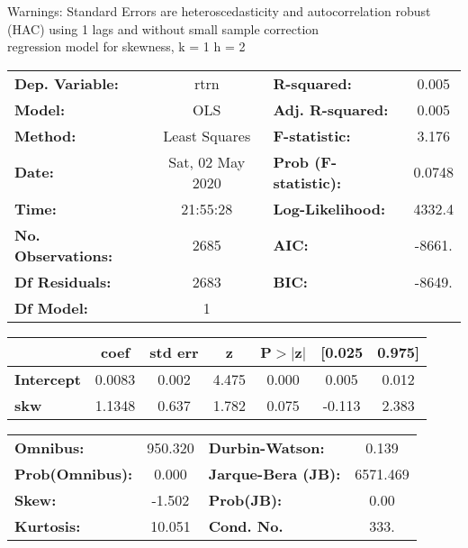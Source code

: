 Warnings: \newline
 [1] Standard Errors are heteroscedasticity and autocorrelation robust (HAC) using 1 lags and without small sample correction\\ 

regression model for skewness, k = 1 h = 2\begin{center}
\begin{tabular}{lclc}
\toprule
\textbf{Dep. Variable:}    &       rtrn       & \textbf{  R-squared:         } &     0.005   \\
\textbf{Model:}            &       OLS        & \textbf{  Adj. R-squared:    } &     0.005   \\
\textbf{Method:}           &  Least Squares   & \textbf{  F-statistic:       } &     3.176   \\
\textbf{Date:}             & Sat, 02 May 2020 & \textbf{  Prob (F-statistic):} &   0.0748    \\
\textbf{Time:}             &     21:55:28     & \textbf{  Log-Likelihood:    } &    4332.4   \\
\textbf{No. Observations:} &        2685      & \textbf{  AIC:               } &    -8661.   \\
\textbf{Df Residuals:}     &        2683      & \textbf{  BIC:               } &    -8649.   \\
\textbf{Df Model:}         &           1      & \textbf{                     } &             \\
\bottomrule
\end{tabular}
\begin{tabular}{lcccccc}
                   & \textbf{coef} & \textbf{std err} & \textbf{z} & \textbf{P$> |$z$|$} & \textbf{[0.025} & \textbf{0.975]}  \\
\midrule
\textbf{Intercept} &       0.0083  &        0.002     &     4.475  &         0.000        &        0.005    &        0.012     \\
\textbf{skw}       &       1.1348  &        0.637     &     1.782  &         0.075        &       -0.113    &        2.383     \\
\bottomrule
\end{tabular}
\begin{tabular}{lclc}
\textbf{Omnibus:}       & 950.320 & \textbf{  Durbin-Watson:     } &    0.139  \\
\textbf{Prob(Omnibus):} &   0.000 & \textbf{  Jarque-Bera (JB):  } & 6571.469  \\
\textbf{Skew:}          &  -1.502 & \textbf{  Prob(JB):          } &     0.00  \\
\textbf{Kurtosis:}      &  10.051 & \textbf{  Cond. No.          } &     333.  \\
\bottomrule
\end{tabular}
\end{center}


